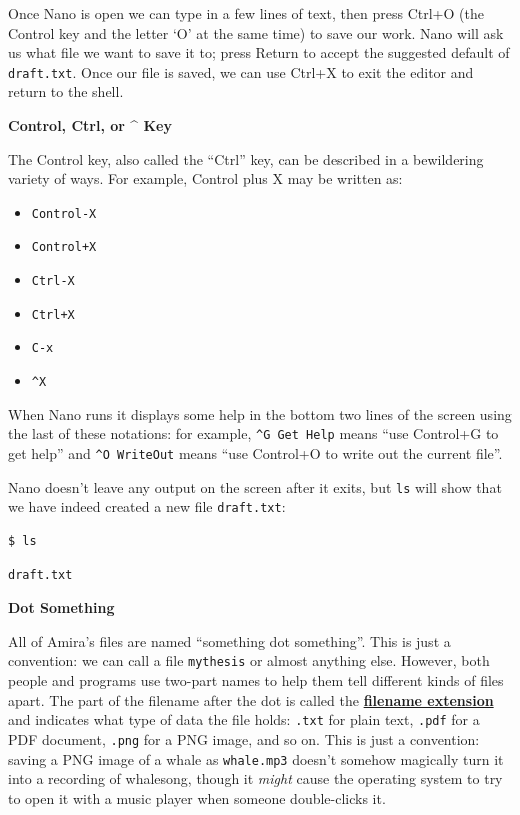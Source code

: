 \documentclass[
]{krantz}
\providecommand{\tightlist}{%
  \setlength{\itemsep}{0pt}\setlength{\parskip}{0pt}}
\renewenvironment{quote}{\begin{VF}}{\end{VF}}
\newcommand{\gref}[2]{\hyperlink{#2}{\textbf{#1}}}
\begin{document}
Once Nano is open we can type in a few lines of text,
then press Ctrl+O
(the Control key and the letter `O' at the same time)
to save our work.
Nano will ask us what file we want to save it to;
press Return to accept the suggested default of \texttt{draft.txt}.
Once our file is saved,
we can use Ctrl+X to exit the editor and return to the shell.

\begin{quote}
\textbf{Control, Ctrl, or \^{} Key}

The Control key,
also called the ``Ctrl'' key,
can be described in a bewildering variety of ways.
For example,
Control plus X may be written as:

\begin{itemize}
\tightlist
\item
  \texttt{Control-X}
\item
  \texttt{Control+X}
\item
  \texttt{Ctrl-X}
\item
  \texttt{Ctrl+X}
\item
  \texttt{C-x}
\item
  \texttt{\^{}X}
\end{itemize}

When Nano runs
it displays some help in the bottom two lines of the screen
using the last of these notations:
for example,
\texttt{\^{}G\ Get\ Help} means ``use Control+G to get help''
and \texttt{\^{}O\ WriteOut} means ``use Control+O to write out the current file''.
\end{quote}

Nano doesn't leave any output on the screen after it exits,
but \texttt{ls} will show that we have indeed created a new file \texttt{draft.txt}:

\begin{verbatim}
$ ls
\end{verbatim}

\begin{verbatim}
draft.txt
\end{verbatim}

\begin{quote}
\textbf{Dot Something}

All of Amira's files are named ``something dot something''.
This is just a convention:
we can call a file \texttt{mythesis} or almost anything else.
However,
both people and programs use two-part names to help them tell different kinds of files apart.
The part of the filename after the dot
is called the \gref{filename extension}{filename\_extension}
and indicates what type of data the file holds:
\texttt{.txt} for plain text,
\texttt{.pdf} for a PDF document,
\texttt{.png} for a PNG image, and so on.
This is just a convention:
saving a PNG image of a whale as \texttt{whale.mp3}
doesn't somehow magically turn it into a recording of whalesong,
though it \emph{might} cause the operating system to try to open it with a music player
when someone double-clicks it.
\end{quote}
\end{document}
